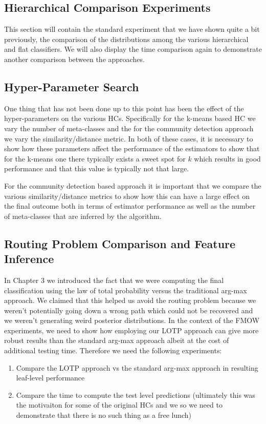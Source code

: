 \documentclass[../thesis.tex]{subfiles}
\begin{document}
\subsection{Hierarchical Comparison Experiments}
This section will contain the standard experiment that we have shown quite a bit previously, the comparison of the distributions among the various hierarchical and flat classifiers. We will also display the time comparison again to demonstrate another comparison between the approaches. 

\subsection{Hyper-Parameter Search}
One thing that has not been done up to this point has been the effect of the hyper-parameters on the various HCs. Specifically for the k-means based HC we vary the number of meta-classes and the for the community detection approach we vary the similarity/distance metric. In both of these cases, it is necessary to show how these parameters affect the performance of the estimators to show that for the k-means one there typically exists a sweet spot for $k$ which results in good performance and that this value is typically not that large.

For the community detection based approach it is important that we compare the various similarity/distance metrics to show how this can have a large effect on the final outcome both in terms of estimator performance as well as the number of meta-classes that are inferred by the algorithm. 

\subsection{Routing Problem Comparison and Feature Inference}
In Chapter 3 we introduced the fact that we were computing the final classification using the law of total probability versus the traditional arg-max approach. We claimed that this helped us avoid the routing problem because we weren't potentially going down a wrong path which could not be recovered and we weren't generating weird posterior distributions. In the context of the FMOW experiments, we need to show how employing our LOTP approach can give more robust results than the standard arg-max approach albeit at the cost of additional testing time. Therefore we need the following experiments:
\begin{enumerate}
    \item Compare the LOTP approach vs the standard arg-max approach in resulting leaf-level performance
    \item Compare the time to compute the test level predictions (ultimately this was the motivaiton for some of the original HCs and we so we need to demonstrate that there is no such thing as a free lunch)
\end{enumerate}
\end{document}
